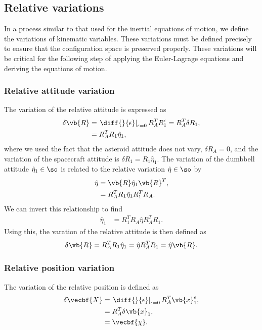 \documentclass[11pt, reqno]{article}    %
\begin{document}
\subsection{Relative variations}\label{ssec:relative_variations}
In a process similar to that used for the inertial equations of motion, we define the variations of kinematic variables.
These variations must be defined precisely to ensure that the configuration space is preserved properly. 
These variations will be critical for the following step of applying the Euler-Lagrage equations and deriving the equations of motion.

\subsubsection{Relative attitude variation}
The variation of the relative attitude is expressed as
\begin{align*}
    \delta \vb{R} &= \left. \diff{}{\epsilon} \right|_{\epsilon=0}  R_A^T R_1^\epsilon = R_A^T \delta R_1, \\
                  &= R_A^T R_1 \hat{\eta}_1,
\end{align*}
where we used the fact that the asteroid attitude does not vary, \( \delta R_A = 0\), and the variation of the spacecraft attitude is \( \delta R_1 = R_1 \hat{\eta}_1\).
The variation of the dumbbell attitude \( \hat{\eta}_1 \in \so \) is related to the relative variation \( \hat{\eta} \in \so \) by
\begin{align*}
    \hat{\eta} &= \vb{R} \hat{\eta}_1 \vb{R}^T ,\\
               &= R_A^T R_1 \hat{\eta}_1 R_1^T R_A .
\end{align*}
We can invert this relationship to find
\begin{align*}
    \hat{\eta}_1 &= R_1^T R_A \hat{\eta} R_A^T R_1 .
\end{align*}
Using this, the varation of the relative attitude is then defined as
\begin{align}\label{eq:relative_attitude_variation}
    \delta \vb{R} = R_A^T R_1 \hat{\eta}_1 = \hat{\eta} R_A^T R_1 = \hat{\eta} \vb{R}.
\end{align}

\subsubsection{Relative position variation}
The variation of the relative position is defined as
\begin{align}\label{eq:relative_position_variation}
    \delta \vecbf{X} &= \left. \diff{}{\epsilon} \right|_{\epsilon=0} R_A^T \vb{x}_1^\epsilon ,\nonumber \\
     &= R_A^T \delta \vb{x}_1 , \nonumber\\
     &= \vecbf{\chi} .
\end{align}
\end{document}
